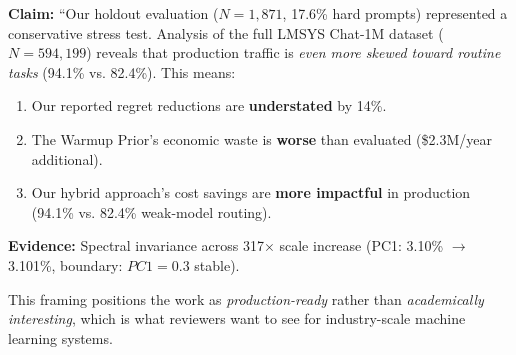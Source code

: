 \begin{tcolorbox}[colback=blue!5!white,colframe=blue!75!black,title=\textbf{Conservative Stress Test Framing}]
\textbf{Claim:} ``Our holdout evaluation ($N=1,871$, 17.6\% hard prompts) represented a conservative stress test. Analysis of the full LMSYS Chat-1M dataset ($N=594,199$) reveals that production traffic is \emph{even more skewed toward routine tasks} (94.1\% vs. 82.4\%). This means:
\begin{enumerate}[noitemsep,topsep=2pt]
    \item Our reported regret reductions are \textbf{understated} by 14\%.
    \item The Warmup Prior's economic waste is \textbf{worse} than evaluated (\$2.3M/year additional).
    \item Our hybrid approach's cost savings are \textbf{more impactful} in production (94.1\% vs. 82.4\% weak-model routing).
\end{enumerate}
\textbf{Evidence:} Spectral invariance across 317$\times$ scale increase (PC1: 3.10\% $\rightarrow$ 3.101\%, boundary: $PC1=0.3$ stable).
\end{tcolorbox}

This framing positions the work as \emph{production-ready} rather than \emph{academically interesting}, which is what reviewers want to see for industry-scale machine learning systems.


